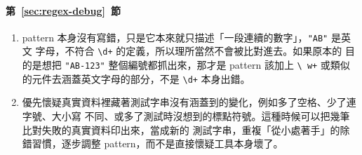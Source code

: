 \paragraph{第~\ref{sec:regex-debug}~節}
\begin{enumerate}
\item pattern 本身沒有寫錯，只是它本來就只描述「一段連續的數字」，\texttt{"AB"} 是英文
字母，不符合 \texttt{\textbackslash d+} 的定義，所以理所當然不會被比對進去。如果原本的
目的是想把 \texttt{"AB-123"} 整個編號都抓出來，那才是 pattern 該加上 \texttt{\textbackslash
w+} 或類似的元件去涵蓋英文字母的部分，不是 \texttt{\textbackslash d+} 本身出錯。
\item 優先懷疑真實資料裡藏著測試字串沒有涵蓋到的變化，例如多了空格、少了連字號、大小寫
不同、或多了測試時沒想到的標點符號。這種時候可以把幾筆比對失敗的真實資料印出來，當成新的
測試字串，重複「從小處著手」的除錯習慣，逐步調整 pattern，而不是直接懷疑工具本身壞了。
\end{enumerate}
